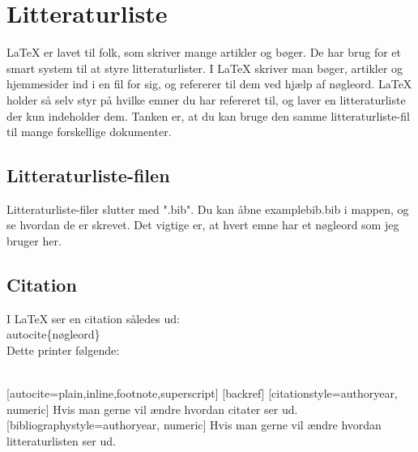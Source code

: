 \section{Litteraturliste}

LaTeX er lavet til folk, som skriver mange artikler og bøger. De har brug for et smart system til at styre litteraturlister. I LaTeX skriver man bøger, artikler og hjemmesider ind i en fil for sig, og refererer til dem ved hjælp af nøgleord. LaTeX holder så selv styr på hvilke emner du har refereret til, og laver en litteraturliste der kun indeholder dem. Tanken er, at du kan bruge den samme litteraturliste-fil til mange forskellige dokumenter.\\

\subsection{Litteraturliste-filen}
Litteraturliste-filer slutter med ".bib". Du kan åbne examplebib.bib i mappen, og se hvordan de er skrevet. Det vigtige er, at hvert emne har et nøgleord som jeg bruger her.

\subsection{Citation}
I LaTeX ser en citation således ud:\\

\bs autocite\{nøgleord\}\\

\noindent
Dette printer følgende:\\

\autocite{vase14}\\

\noindent




\nocite{john3}
[autocite=plain,inline,footnote,superscript] %
[backref] %
[citationstyle=authoryear, numeric] Hvis man gerne vil ændre hvordan citater ser ud.
[bibliographystyle=authoryear, numeric] Hvis man gerne vil ændre hvordan litteraturlisten ser ud.

